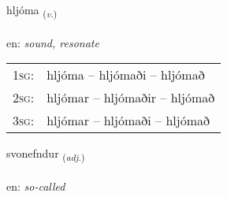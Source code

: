 \documentclass[frontgrid, backgrid]{flacards}\usepackage[]{graphicx}\usepackage[]{color}
\begin{document}
\renewcommand{\flhead}{\vskip5pt \fboxsep=0pt {\small\bfseries\footnotesize Sagnorð | Verb}}
\renewcommand{\fcfoot}{\vskip5pt \fboxsep=0pt \hspace{2pt}{\small\bfseries\footnotesize 2K}}

\renewcommand{\blhead}{\vskip5pt {\small\bfseries\footnotesize Sagnorð | Verb }}
\renewcommand{\bcfoot}{\vskip5pt \hspace{2pt}{\small\bfseries\footnotesize 2K}}


{hljóma \small{\textsubscript{(\textit{v.})}} \\[1ex] %
\textphonetic{[l̥jouːma]} \\
en: \emph{sound, resonate} \\  [2ex]
\renewcommand*{\arraystretch}{0.8}
\begin{tabular}{p{1cm}l}
\textsc{1sg}: & hljóma -- hljómaði -- hljómað \\ 
\textsc{2sg}: & hljómar -- hljómaðir -- hljómað \\ 
\textsc{3sg}: & hljómar -- hljómaði -- hljómað \\ 
\end{tabular}
}

\renewcommand{\flhead}{\vskip5pt \fboxsep=0pt {\small\bfseries\footnotesize Lýsingarorð | Adjective}}
\renewcommand{\fcfoot}{\vskip5pt \fboxsep=0pt \hspace{2pt}{\small\bfseries\footnotesize 2K}}

\renewcommand{\blhead}{\vskip5pt {\small\bfseries\footnotesize Lýsingarorð | Adjective }}
\renewcommand{\bcfoot}{\vskip5pt \hspace{2pt}{\small\bfseries\footnotesize 2K}}


{svonefndur \small{\textsubscript{(\textit{adj.})}} \\[1ex] %
\textphonetic{[svɔnɛmtʏr]} \\
en: \emph{so-called} \\  [2ex]
\renewcommand*{\arraystretch}{0.8}
}
\end{document}
